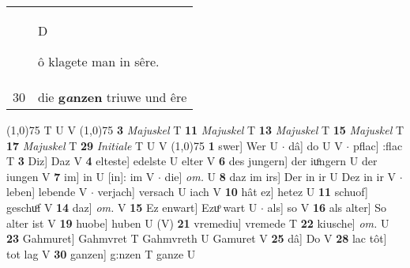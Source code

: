 \documentclass[8pt,a4paper,notitlepage]{article}
\begin{document}
\begin{table}[ht]
\begin{minipage}[t]{0.5\linewidth}
\begin{tabular}{rl}
 & \begin{large}D\end{large}ô klagete man in sêre.\\ 
30 & die \textbf{g\textit{a}nzen} triuwe und êre\\ 
\end{tabular}
\scriptsize
\line(1,0){75} \newline
T U V \newline
\line(1,0){75} \newline
\textbf{3} \textit{Majuskel} T  \textbf{11} \textit{Majuskel} T  \textbf{13} \textit{Majuskel} T  \textbf{15} \textit{Majuskel} T  \textbf{17} \textit{Majuskel} T  \textbf{29} \textit{Initiale} T U V  \newline
\line(1,0){75} \newline
\textbf{1} swer] Wer U  $\cdot$ dâ] do U V  $\cdot$ pflac] :flac T \textbf{3} Diz] Daz V \textbf{4} elteste] edelste U elter V \textbf{6} des jungern] der iuͦngern U der iungen V \textbf{7} im] in U [in]: im V  $\cdot$ die] \textit{om.} U \textbf{8} daz im irs] Der in ir U Dez in ir V  $\cdot$ leben] lebende V  $\cdot$ verjach] versach U iach V \textbf{10} hât ez] hetez U \textbf{11} schuof] geschuͦf V \textbf{14} daz] \textit{om.} V \textbf{15} Ez enwart] Ezuͦ wart U  $\cdot$ als] so V \textbf{16} als alter] So alter ist V \textbf{19} huobe] huben U (V) \textbf{21} vremediu] vremede T \textbf{22} kiusche] \textit{om.} U \textbf{23} Gahmuret] Gahmvret T Gahmvreth U Gamuret V \textbf{25} dâ] Do V \textbf{28} lac tôt] tot lag V \textbf{30} ganzen] g:nzen T ganze U \newline
\end{minipage}
\end{table}
\end{document}
